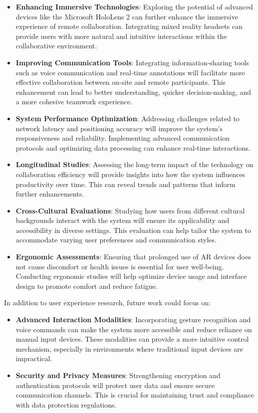 \begin{itemize}
    \item \textbf{Enhancing Immersive Technologies}: Exploring the potential of advanced devices like the Microsoft HoloLens 2 can further enhance the immersive experience of remote collaboration. Integrating mixed reality headsets can provide users with more natural and intuitive interactions within the collaborative environment.
    \item \textbf{Improving Communication Tools}: Integrating information-sharing tools such as voice communication and real-time annotations will facilitate more effective collaboration between on-site and remote participants. This enhancement can lead to better understanding, quicker decision-making, and a more cohesive teamwork experience.
    \item \textbf{System Performance Optimization}: Addressing challenges related to network latency and positioning accuracy will improve the system's responsiveness and reliability. Implementing advanced communication protocols and optimizing data processing can enhance real-time interactions.


    \item \textbf{Longitudinal Studies}: Assessing the long-term impact of the technology on collaboration efficiency will provide insights into how the system influences productivity over time. This can reveal trends and patterns that inform further enhancements.
    \item \textbf{Cross-Cultural Evaluations}: Studying how users from different cultural backgrounds interact with the system will ensure its applicability and accessibility in diverse settings. This evaluation can help tailor the system to accommodate varying user preferences and communication styles.
    \item \textbf{Ergonomic Assessments}: Ensuring that prolonged use of AR devices does not cause discomfort or health issues is essential for user well-being. Conducting ergonomic studies will help optimize device usage and interface design to promote comfort and reduce fatigue.

\end{itemize}

In addition to user experience research, future work could focus on:

\begin{itemize} 

    \item \textbf{Advanced Interaction Modalities}: Incorporating gesture recognition and voice commands can make the system more accessible and reduce reliance on manual input devices. These modalities can provide a more intuitive control mechanism, especially in environments where traditional input devices are impractical.
    
    \item \textbf{Security and Privacy Measures}: Strengthening encryption and authentication protocols will protect user data and ensure secure communication channels. This is crucial for maintaining trust and compliance with data protection regulations.
\end{itemize}

